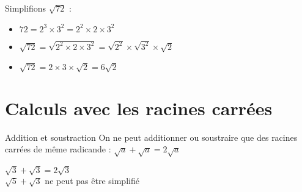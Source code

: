 \begin{exemple}
Simplifions $\sqrt{72}$ :
\begin{itemize}
    \item $72 = 2^3 \times 3^2 = 2^2 \times 2 \times 3^2$
    \item $\sqrt{72} = \sqrt{2^2 \times 2 \times 3^2} = \sqrt{2^2} \times \sqrt{3^2} \times \sqrt{2}$
    \item $\sqrt{72} = 2 \times 3 \times \sqrt{2} = 6\sqrt{2}$
\end{itemize}
\end{exemple}

\section{Calculs avec les racines carrées}
\begin{propriete}{Addition et soustraction}
On ne peut additionner ou soustraire que des racines carrées de même radicande :
$\sqrt{a} + \sqrt{a} = 2\sqrt{a}$
\end{propriete}

\begin{exemple}
$\sqrt{3} + \sqrt{3} = 2\sqrt{3}$\\
$\sqrt{5} + \sqrt{3}$ ne peut pas être simplifié
\end{exemple} 